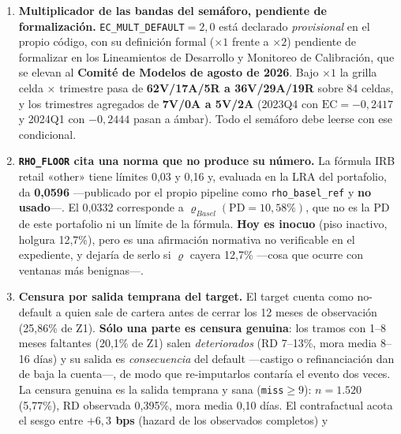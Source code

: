 \documentclass[12pt, a4paper]{article}
\newcommand{\PD}{\ensuremath{\mathrm{PD}}}
\renewcommand{\rho}{\ensuremath{\varrho}}
\newcommand{\EC}{\ensuremath{\mathrm{EC}}}
\begin{document}
\begin{enumerate}[nosep]
    fuera de muestra no separa a las dos familias ($p=0{,}1956$ en DEP y $p=0{,}3321$ en
    NO DEP), de modo que la preferencia por Beta \textbf{no se apoya en superioridad de
    ajuste} sino en criterio metodológico: la familia contiene a Platt y a la identidad
    como casos particulares y garantiza la monotonía por construcción (Kull et al.\ 2017).
    Lo que la medición sí decide es que calibrar es obligatorio, que el shift no absorbe
    la forma y que la isotónica se descarta.
  \item \textbf{Multiplicador de las bandas del semáforo, pendiente de formalización.}
    \texttt{EC\_MULT\_DEFAULT}$=2{,}0$ está declarado \emph{provisional} en el propio código, con su definición formal ($\times1$ frente a $\times2$) pendiente de formalizar en los Lineamientos de Desarrollo y Monitoreo de Calibración, que se elevan al \textbf{Comité de Modelos de agosto de 2026}. Bajo $\times1$ la grilla celda $\times$ trimestre pasa de
    \textbf{62V/17A/5R a 36V/29A/19R} sobre 84 celdas, y los trimestres agregados de \textbf{7V/0A a 5V/2A} (2023Q4 con
    $\EC=-0{,}2417$ y 2024Q1 con $-0{,}2444$ pasan a ámbar). Todo el semáforo debe leerse con ese
    condicional.
  \item \textbf{\texttt{RHO\_FLOOR} cita una norma que no produce su número.} La fórmula IRB retail
    «other» tiene límites 0,03 y 0,16 y, evaluada en la LRA del portafolio, da \textbf{0,0596}
    ---publicado por el propio pipeline como \texttt{rho\_basel\_ref} y \textbf{no usado}---. El
    0,0332 corresponde a $\rho_{Basel}(\PD=10{,}58\%)$, que no es la PD de este portafolio ni un
    límite de la fórmula. \textbf{Hoy es inocuo} (piso inactivo, holgura 12,7\%), pero es una
    afirmación normativa no verificable en el expediente, y dejaría de serlo si $\rho$ cayera
    12,7\% ---cosa que ocurre con ventanas más benignas---.
  \item \textbf{Censura por salida temprana del target.} El target cuenta como no-default a quien
    sale de cartera antes de cerrar los 12 meses de observación (25,86\% de Z1). \textbf{Sólo una
    parte es censura genuina}: los tramos con 1--8 meses faltantes (20,1\% de Z1) salen
    \emph{deteriorados} (RD 7--13\%, mora media 8--16 días) y su salida es \emph{consecuencia} del
    default ---castigo o refinanciación dan de baja la cuenta---, de modo que re-imputarlos contaría
    el evento dos veces. La censura genuina es la salida temprana y sana
    (\texttt{miss}$\ge9$): $n=1.520$ (5,77\%), RD observada 0,395\%, mora media 0,10 días. El
    contrafactual acota el sesgo entre \textbf{$+6{,}3$ bps} (hazard de los observados completos) y

\end{enumerate}
\end{document}
